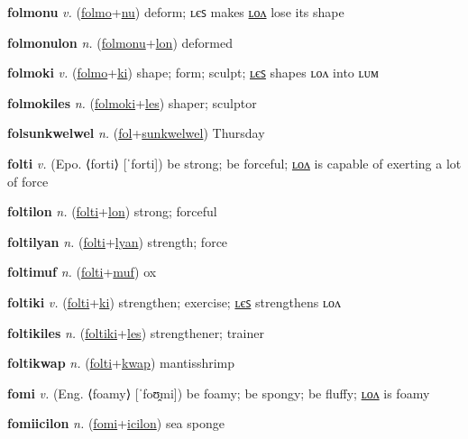 \textbf{\hypertarget{folmonu}{folmonu}} \textit{v.} (\hyperlink{folmo}{folmo}+\allowbreak \hyperlink{nu}{nu})
deform; ʟєꜱ makes \hyperlink{folmonulon}{ʟᴏᴧ} lose its shape

\textbf{\hypertarget{folmonulon}{folmonulon}} \textit{n.} (\hyperlink{folmonu}{folmonu}+\allowbreak \hyperlink{lon}{lon})
deformed

\textbf{\hypertarget{folmoki}{folmoki}} \textit{v.} (\hyperlink{folmo}{folmo}+\allowbreak \hyperlink{ki}{ki})
shape; form; sculpt; \hyperlink{folmokiles}{ʟєꜱ} shapes ʟᴏᴧ into ʟᴜᴍ

\textbf{\hypertarget{folmokiles}{folmokiles}} \textit{n.} (\hyperlink{folmoki}{folmoki}+\allowbreak \hyperlink{les}{les})
shaper; sculptor

\textbf{\hypertarget{folsunkwelwel}{folsunkwelwel}} \textit{n.} (\hyperlink{fol}{fol}+\allowbreak \hyperlink{sunkwelwel}{sunkwelwel})
Thursday

\textbf{\hypertarget{folti}{folti}} \textit{v.} (Epo. ⟨forti⟩ [ˈforti])
be strong; be forceful; \hyperlink{foltilon}{ʟᴏᴧ} is capable of exerting a lot of force

\textbf{\hypertarget{foltilon}{foltilon}} \textit{n.} (\hyperlink{folti}{folti}+\allowbreak \hyperlink{lon}{lon})
strong; forceful

\textbf{\hypertarget{foltilyan}{foltilyan}} \textit{n.} (\hyperlink{folti}{folti}+\allowbreak \hyperlink{lyan}{lyan})
strength; force

\textbf{\hypertarget{foltimuf}{foltimuf}} \textit{n.} (\hyperlink{folti}{folti}+\allowbreak \hyperlink{muf}{muf})
ox

\textbf{\hypertarget{foltiki}{foltiki}} \textit{v.} (\hyperlink{folti}{folti}+\allowbreak \hyperlink{ki}{ki})
strengthen; exercise; \hyperlink{foltikiles}{ʟєꜱ} strengthens ʟᴏᴧ

\textbf{\hypertarget{foltikiles}{foltikiles}} \textit{n.} (\hyperlink{foltiki}{foltiki}+\allowbreak \hyperlink{les}{les})
strengthener; trainer

\textbf{\hypertarget{foltikwap}{foltikwap}} \textit{n.} (\hyperlink{folti}{folti}+\allowbreak \hyperlink{kwap}{kwap})
mantisshrimp

\textbf{\hypertarget{fomi}{fomi}} \textit{v.} (Eng. ⟨foamy⟩ [ˈfoʊ̯mi])
be foamy; be spongy; be fluffy; \hyperlink{fomilon}{ʟᴏᴧ} is foamy

\textbf{\hypertarget{fomiicilon}{fomiicilon}} \textit{n.} (\hyperlink{fomi}{fomi}+\allowbreak \hyperlink{icilon}{icilon})
sea sponge

